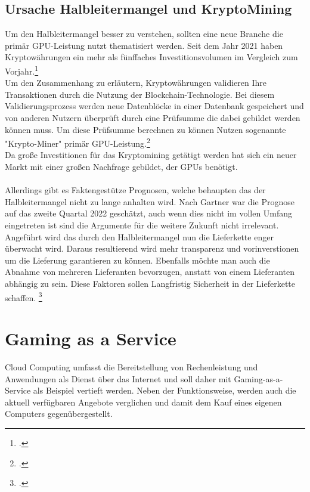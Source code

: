 \documentclass[12pt,toc=bib,toc=listof]{scrreprt}
\begin{document}
\section{Ursache Halbleitermangel und KryptoMining}
\label{sec:Ursache Halbleitermangel und KryptoMining}

Um den Halbleitermangel besser zu verstehen, sollten eine neue Branche die primär GPU-Leistung 
nutzt thematisiert werden. Seit dem Jahr 2021 haben Kryptowährungen ein mehr als fünffaches Investitionsvolumen
im Vergleich zum Vorjahr.\footcite [] [] {Statista_Research_1}
\\Um den Zusammenhang zu erläutern, Kryptowährungen validieren Ihre Transaktionen durch die Nutzung der 
Blockchain-Technologie. Bei diesem Validierungsprozess werden neue Datenblöcke in einer Datenbank gespeichert und von anderen
Nutzern überprüft durch eine Prüfsumme die dabei gebildet werden können muss. Um diese Prüfsumme berechnen zu können
Nutzen sogenannte "Krypto-Miner" primär GPU-Leistung.\footcite [Vgl.] [S.259-273] {Arslanian.2022}
\\Da große Investitionen für das Kryptomining getätigt werden hat sich ein neuer Markt mit einer großen Nachfrage gebildet, der
GPUs benötigt.
\\ \\
%
Allerdings gibt es Faktengestütze Prognosen, welche behaupten das der Halbleitermangel nicht zu lange anhalten wird. 
Nach Gartner war die Prognose auf das zweite Quartal 2022 geschätzt, auch wenn dies nicht im vollen Umfang eingetreten ist sind 
die Argumente für die weitere Zukunft nicht irrelevant.\\
Angeführt wird das durch den Halbleitermangel nun die Lieferkette enger überwacht wird.
Daraus resultierend wird mehr transparenz und vorinverstionen um die Lieferung garantieren zu können. 
Ebenfalls möchte man auch die Abnahme von mehreren Lieferanten bevorzugen, anstatt von einem Lieferanten abhängig zu sein.
Diese Faktoren sollen Langfristig Sicherheit in der Lieferkette schaffen. \footcite [Vgl.] [] {Gartner.2021}

\chapter{Gaming as a Service}
\label{sec: Gaming as a Service}

Cloud Computing umfasst die Bereitstellung von Rechenleistung und Anwendungen als Dienst über das Internet und soll daher mit Gaming-as-a-Service als Beispiel vertieft werden. Neben der Funktionsweise, werden auch die aktuell verfügbaren Angebote verglichen und damit dem Kauf eines eigenen Computers gegenübergestellt.
\end{document}
